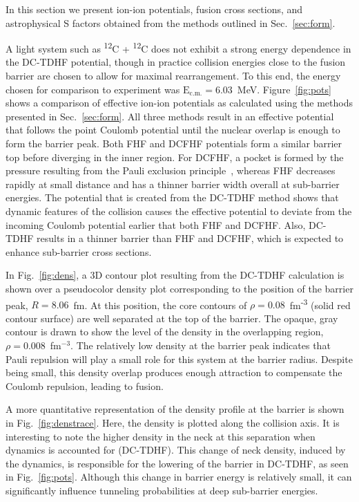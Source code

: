 In this section we present ion-ion potentials, fusion cross sections, and astrophysical S factors obtained from the methods outlined in Sec.~\ref{sec:form}.

A light system such as \textsuperscript{12}C + \textsuperscript{12}C does not exhibit a strong energy dependence in the DC-TDHF potential, though in practice collision energies close to the fusion barrier are chosen to allow for maximal rearrangement.
To this end, the energy chosen for comparison to experiment was $\mathrm{E_{c.m.}}=6.03$~MeV.
Figure~\ref{fig:pots} shows a comparison of effective ion-ion potentials as calculated using the methods presented in Sec.~\ref{sec:form}.
All three methods result in an effective potential that follows the point Coulomb potential until the nuclear overlap is enough to form the barrier peak.
Both FHF and DCFHF potentials form a similar barrier top before diverging in the inner region.
For DCFHF, a pocket is formed by the pressure resulting from the Pauli exclusion principle~\protect\cite{simenel2017}, whereas FHF decreases rapidly at small distance and has a thinner barrier width overall at sub-barrier energies.
The potential that is created from the DC-TDHF method shows that dynamic features of the collision causes the effective potential to deviate from the incoming Coulomb potential earlier that both FHF and DCFHF.
Also, DC-TDHF results in a thinner barrier than FHF and DCFHF, which is expected to enhance sub-barrier cross sections.

In Fig.~\ref{fig:dens}, a 3D contour plot resulting from the DC-TDHF calculation is shown over a pseudocolor density plot corresponding to the position of the barrier peak, $R=8.06$~fm. 
At this position, the core contours of $\rho = 0.08$~fm\textsuperscript{-3} (solid red contour surface) are well separated at the top of the barrier. 
The opaque, gray contour is drawn to show the level of the density in the overlapping region, $\rho = 0.008$~fm$^{-3}$.
The relatively low density at the barrier peak indicates that Pauli repulsion will play a small role for this system at the barrier radius.
Despite being small, this density overlap produces enough attraction to compensate the Coulomb repulsion, leading to fusion.

A more quantitative representation of the density profile at the barrier is shown in Fig.~\ref{fig:denstrace}.
Here, the density is plotted along the collision axis. 
It is interesting to note the higher density in the neck at this separation when dynamics is accounted for (DC-TDHF).
This change of neck density, induced by the dynamics, is responsible for the lowering of the barrier in DC-TDHF, as seen in Fig.~\ref{fig:pots}.
Although this change in barrier energy is relatively small, it can significantly influence tunneling probabilities at deep sub-barrier energies. 

